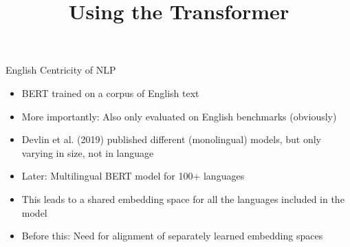 



\newcommand{\titlefigure}{figure/bert.jpeg}
\newcommand{\learninggoals}{
\item Understand how impactful this architecture was
\item See how this changed research in the field}

\title{Using the Transformer}
\date{}




\begin{frame}{English Centricity of NLP}

\vfill

	\begin{itemize}
		\item BERT trained on a corpus of English text
		\item More importantly: Also only evaluated on English benchmarks (obviously)\\	
					\href{https://gluebenchmark.com/}{}
					\href{https://rajpurkar.github.io/SQuAD-explorer/}{}
					\href{https://www.qizhexie.com/data/RACE_leaderboard.html}{}
		\item Devlin et al. (2019) published different (monolingual) models, but only varying in size, not in language
		\item Later: Multilingual BERT model \href{https://github.com/google-research/bert/blob/master/multilingual.md}{} for 100+ languages
		\item This leads to a shared embedding space for all the languages included in the model
		\item Before this: Need for alignment of separately learned embedding spaces
	\end{itemize}

\vfill

\end{frame}



